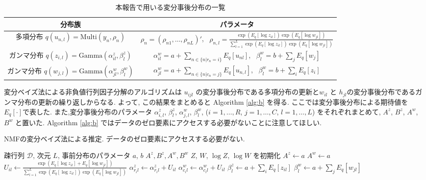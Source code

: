 \documentclass[a4paper,12pt]{jsarticle} %
\numberwithin{equation}{section} %
\begin{document}
\renewcommand{\arraystretch}{1.75}
\begin{table}
\centering
\caption{本報告で用いる変分事後分布の一覧} \label{post1}
\begin{tabular}{cc}
分布族 & パラメータ\\
\hline
多項分布 $q(u_{n,l}) = \mathrm{Multi}(y_n, \rho_n)$ & $\rho_n = (\rho_{n1},\dots, \rho_{nL})'$,~ $\displaystyle \rho_{n, l} = \frac{\exp(E_q[\log z_{il}] )\exp(E_q[\log w_{jl}] )}{ \sum_{l=1}^L \exp(E_q[\log z_{il}] )\exp(E_q[\log w_{jl}] )}$\\
ガンマ分布 $q(z_{i,l}) = \mathrm{Gamma}(\alpha^z_{il}, \beta^z_l)$ & $\displaystyle \alpha^w_{il}=a+\sum_{n \in \{n|r_n=i\}} E_q[u_{nl}]$,~ $\displaystyle \beta^w_{l} = b+\sum_j E_q[w_j]$\\
ガンマ分布 $q(w_{j,l}) = \mathrm{Gamma}(\alpha^w_{jl}, \beta^w_{l})$ & $\displaystyle \alpha^w_{jl}=a+\sum_{n \in \{n|c_n=j\}} E_q[u_{n,l}]$,~ $\displaystyle \beta^w_{l} = b+\sum_i E_q[z_i]$ \\
\hline
\end{tabular}
\end{table}
\renewcommand{\arraystretch}{1}

変分ベイズ法による非負値行列因子分解のアルゴリズムは $u_{ijl}$ の変分事後分布である多項分布の更新と$w_{il}$ と $h_{jl}$の変分事後分布であるガンマ分布の更新の繰り返しからなる. 
よって, この結果をまとめると Algorithm \ref{alg:b} を得る. ここでは変分事後分布による期待値を$E_q[\cdot]$で表した. また,変分事後分布のパラメータ $\alpha^z_{i,l}$, $\beta^z_{l}$, $\alpha^w_{j,l}$, $\beta^w_{l}$, ($i=1,\ldots, R$, $j=1,\ldots, C$, $l=1, \ldots ,L$) をそれぞれまとめて, $A^z$, $B^z$, $A^w$, $B^w$ と置いた. Algorithm \ref{alg:b} ではデータのゼロ要素にアクセスする必要がないことに注意してほしい.

\begin{algorithm}[tbp]
\caption{NMFの変分ベイズ法による推定. データのゼロ要素にアクセスする必要がない. }\label{alg:b}
\begin{algorithmic}
\Require \Require 疎行列 $\mathcal{D}$, 次元 $L$, 事前分布のパラメータ $a$, $b$
\Ensure $A^z, B^z, A^w, B^w$ 
\State $Z$, $W$, $\log Z$, $\log W$ を初期化  
\State $A^z \leftarrow  a$  
\State $A^w \leftarrow a$
 
  \State $\displaystyle U_{il} \leftarrow  \frac{\exp(E_q[\log z_{il}] + E_q[\log w_{jl}])}{\sum_{l=1}^L \exp(E_q[\log z_{il}] )\exp(E_q[\log w_{jl}])}$  
    \State $\alpha^z_{r_i l}  \leftarrow \alpha^z_{r_i l} + U_{il}$ 
    \State $\alpha^w_{c_i l} \leftarrow  \alpha^w_{c_i l}+ U_{il}$
\EndFor
    \State $\beta^z_{l}  \leftarrow  a +  \sum_i E_q[z_{il}]$
    \State $\beta^w_{l}  \leftarrow a + \sum_j E_q[w_{jl}]$
\EndWhile
\end{algorithmic}
\end{algorithm}
\end{document}
